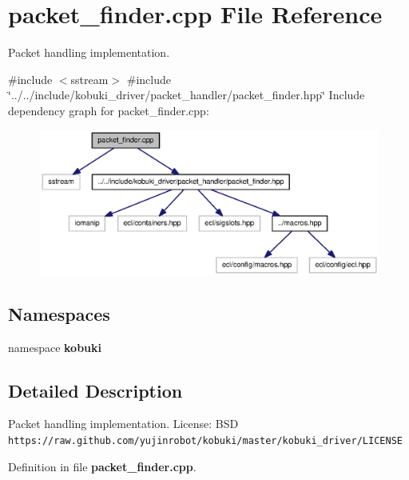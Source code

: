\section{packet\-\_\-finder.\-cpp \-File \-Reference}
\label{packet__finder_8cpp}


\-Packet handling implementation.  


{\ttfamily \#include $<$sstream$>$}\*
{\ttfamily \#include \char`\"{}../../include/kobuki\-\_\-driver/packet\-\_\-handler/packet\-\_\-finder.\-hpp\char`\"{}}\*
\-Include dependency graph for packet\-\_\-finder.\-cpp\-:
\nopagebreak
\begin{figure}[H]
\begin{center}
\leavevmode
\includegraphics[width=350pt]{packet__finder_8cpp__incl}
\end{center}
\end{figure}
\subsection*{\-Namespaces}
\begin{DoxyCompactItemize}
\item 
namespace {\bf kobuki}
\end{DoxyCompactItemize}


\subsection{\-Detailed \-Description}
\-Packet handling implementation. \-License\-: \-B\-S\-D {\tt https\-://raw.\-github.\-com/yujinrobot/kobuki/master/kobuki\-\_\-driver/\-L\-I\-C\-E\-N\-S\-E} 

\-Definition in file {\bf packet\-\_\-finder.\-cpp}.

